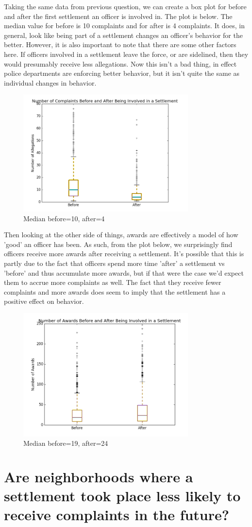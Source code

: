 \documentclass{article}
\begin{document}
Taking the same data from previous question, we can create a box plot for before and after the first settlement an officer is involved in. The plot is below. The median value for before is 10 complaints and for after is 4 complaints. It does, in general, look like being part of a settlement changes an officer's behavior for the better. However, it is also important to note that there are some other factors here. If officers involved in a settlement leave the force, or are sidelined, then they would presumably receive less allegations. Now this isn't a bad thing, in effect police departments are enforcing better behavior, but it isn't quite the same as individual changes in behavior.

\begin{figure}[h!]
\centering
\caption{Median before=10, after=4}
\includegraphics[width=0.8\textwidth]{settb.png}
\end{figure}

Then looking at the other side of things, awards are effectively a model of how 'good' an officer has been. As such, from the plot below, we surprisingly find officers receive more awards after receiving a settlement. It's possible that this is partly due to the fact that officers spend more time 'after' a settlement vs 'before' and thus accumulate more awards, but if that were the case we'd expect them to accrue more complaints as well. The fact that they receive fewer complaints and more awards does seem to imply that the settlement has a positive effect on behavior.

\begin{figure}[h!]
\centering
\caption{Median before=19, after=24}
\includegraphics[width=0.8\textwidth]{awards.png}
\end{figure}

\FloatBarrier


\section{Are neighborhoods where a settlement took place less likely to receive complaints in the future?}
\end{document}
